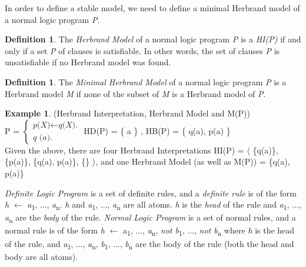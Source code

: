 \documentclass[11pt,twoside]{report}
\theoremstyle{plain}
\theoremstyle{definition}
\newtheorem{defn}[thm]{Definition} %
\newtheorem{examp}{Example}[section]
\begin{document}
In order to define a stable model, we need to define a minimal Herbrand model of a normal logic program \textit{P}.

\begin{defn}
The \textit{Herbrand Model} of a normal logic program \textit{P} is a \textit{HI(P)} if and only if a set \textit{P} of clauses is satisfiable. In other words, the set of clauses \textit{P} is unsatisfiable if no Herbrand model was found.
\end{defn}

\begin{defn}
The \textit{Minimal Herbrand Model} of a normal logic program \textit{P} is a Herbrand model \textit{M} if none of the subset of \textit{M} is a Herbrand model of \textit{P}.
\end{defn}



\begin{examp} \normalfont (Herbrand Interpretation, Herbrand Model and M(P)) \\

P = $\begin{cases}
	\textit{p(X)}  \leftarrow \textit{q(X).} \\
	\textit{q (a).}
      \end{cases}$
HD(P) = \{ a \} , HB(P) = \{ q(a), p(a) \}  \\

Given the above, there are four Herbrand Interpretations HI(P) = $\langle$ \{q(a)\}, \{p(a)\}, \{q(a), p(a)\}, \{\} $\rangle$, and one Herbrand Model (as well as M(P)) = \{q(a), p(a)\}

\end{examp}

\textit{Definite Logic Program} is a set of definite rules, and  a \textit{definite rule} is of the form \textit{h} $\leftarrow$ \textit{a}\textsubscript{1}, ..., \textit{a}\textsubscript{n}.  \textit{h} and  \textit{a}\textsubscript{1}, ..., \textit{a}\textsubscript{n} are all atoms. \textit{h} is the \textit{head} of the rule and \textit{a}\textsubscript{1}, ..., \textit{a}\textsubscript{n} are the \textit{body} of the rule.
\textit{Normal Logic Program} is a set of normal rules, and a normal rule is of the form \textit{h} $\leftarrow$ a\textsubscript{1}, ..., \textit{a}\textsubscript{n}, \textit{not b}\textsubscript{1}, ..., \textit{not  b}\textsubscript{n} where \textit{h} is the head of the rule,
 and \textit{a}\textsubscript{1}, ..., \textit{a}\textsubscript{n}, \textit{b}\textsubscript{1}, ..., \textit{b}\textsubscript{n} are the body of the rule (both the head and body are all atoms).
\end{document}
